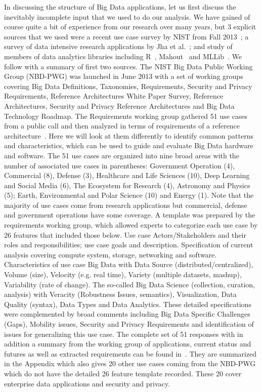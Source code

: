 \documentclass{acm_proc_article-sp}
\begin{document}
In discussing the structure of Big Data applications, let us first discuss the inevitably incomplete input that we used to do our analysis. We have gained of course quite a bit of experience from our research over many years, but 3 explicit sources that we used were a recent use case survey by NIST from Fall 2013~\cite{bb}; a survey of data intensive research applications by Jha et al.~\cite{b28,b26}; and study of members of data analytics libraries including R~\cite{b4}, Mahout~\cite{b1} and MLLib~\cite{b3}. We follow with a summary of first two sources.
The NIST Big Data Public Working Group (NBD-PWG) was launched in June 2013 with a set of working groups covering Big Data Definitions, Taxonomies, Requirements, Security and Privacy Requirements, Reference Architectures White Paper Survey, Reference Architectures, Security and Privacy Reference Architectures and Big Data Technology Roadmap. The Requirements working group gathered 51 use cases from a public call and then analyzed in terms of requirements of a reference architecture~\cite{b21}. Here we will look at them differently to identify common patterns and characteristics, which can be used to guide and evaluate Big Data hardware and software. The 51 use cases are organized into nine broad areas with the number of associated use cases in parentheses: Government Operation (4), Commercial (8), Defense (3), Healthcare and Life Sciences (10), Deep Learning and Social Media (6), The Ecosystem for Research (4), Astronomy and Physics (5); Earth, Environmental and Polar Science (10) and Energy (1). 
Note that the majority of use cases come from research applications but commercial, defense and government operations have some coverage. A template was prepared by the requirements working group, which allowed experts to categorize each use case by 26 features that included those below.
Use case Actors/Stakeholders and their roles and responsibilities; use case goals and description. Specification of current analysis covering compute system, storage, networking and software.  Characteristics of use case Big Data with Data Source (distributed/centralized), Volume (size), Velocity (e.g. real time), Variety (multiple datasets, mashup), Variability (rate of change). The so-called Big Data Science (collection, curation, analysis) with Veracity (Robustness Issues, semantics), Visualization, Data Quality (syntax), Data Types and Data Analytics. These detailed specifications were complemented by broad comments including Big Data Specific Challenges (Gaps), Mobility issues, Security and Privacy Requirements and identification of issues for generalizing this use case.
The complete set of 51 responses with in addition a summary from the working group of applications, current status and futures as well as extracted requirements can be found in~\cite{b21}. They are summarized in the Appendix which also gives 20 other use cases coming from the NBD-PWG which do not have the detailed 26 feature template recorded. These 20 cover enterprise data applications and security and privacy.
\end{document}

